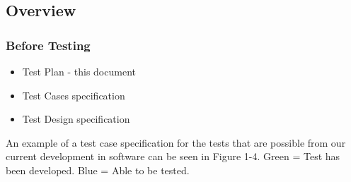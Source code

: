 \subsection{Overview}
\subsubsection{Before Testing}
\begin{itemize}
    \item Test Plan - this document
    \item{Test Cases specification}
    \item{Test Design specification}
\end{itemize}
An example of a test case specification for the tests that are possible from our current development in software can be seen in Figure 1-4. Green = Test has been developed. Blue = Able to be tested. 


